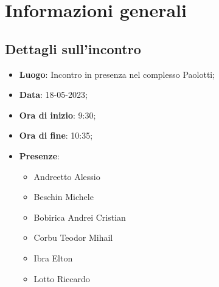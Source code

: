 \section{Informazioni generali}

\subsection{Dettagli sull'incontro}
\begin{itemize}
\item \textbf{Luogo}: Incontro in presenza nel complesso Paolotti;
\item \textbf{Data}: 18-05-2023;
\item \textbf{Ora di inizio}: 9:30;
\item \textbf{Ora di fine}: 10:35;
\item \textbf{Presenze}: 
\begin{itemize}
	\item Andreetto Alessio
    \item Beschin Michele
    \item Bobirica Andrei Cristian
    \item Corbu Teodor Mihail
    \item Ibra Elton
    \item Lotto Riccardo
\end{itemize}
\end{itemize}




